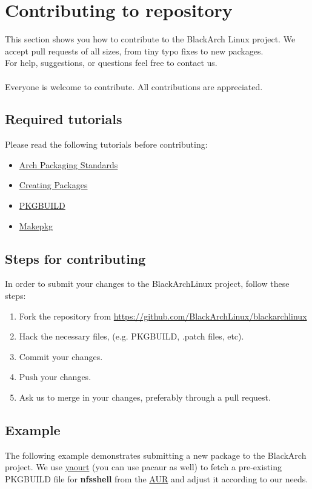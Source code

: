 \documentclass[a4paper, oneside, 11pt]{book}
\begin{document}
\section{Contributing to repository}
This section shows you how to contribute to the BlackArch Linux project. We
accept pull requests of all sizes, from tiny typo fixes to new packages.\\For
help, suggestions, or questions feel free to contact us.
\\\\
Everyone is welcome to contribute. All contributions are appreciated.

\subsection{Required tutorials}
Please read the following tutorials before contributing:
\begin{itemize}
\item
\href{https://wiki.archlinux.org/index.php/Arch\_Packaging\_Standards)}{Arch
Packaging Standards}
\item \href{https://wiki.archlinux.org/index.php/Creating\_Packages}{Creating
Packages}
\item \href{https://wiki.archlinux.org/index.php/PKGBUILD}{PKGBUILD}
\item \href{https://wiki.archlinux.org/index.php/Makepkg}{Makepkg}
\end{itemize}

\subsection{Steps for contributing}
In order to submit your changes to the BlackArchLinux project, follow these
steps:
\begin{enumerate}
\item Fork the repository from
\url{https://github.com/BlackArchLinux/blackarchlinux}
\item Hack the necessary files, (e.g. PKGBUILD, .patch files, etc).
\item Commit your changes.
\item Push your changes.
\item Ask us to merge in your changes, preferably through a pull request.
\end{enumerate}

\subsection{Example}
The following example demonstrates submitting a new package to the BlackArch
project. We use \href{https://wiki.archlinux.org/index.php/yaourt}{yaourt}
(you can use pacaur as well) to fetch a pre-existing PKGBUILD file for
\textbf{nfsshell} from the \href{https://aur.archlinux.org/}{AUR} and adjust it
according to our needs.
\end{document}
